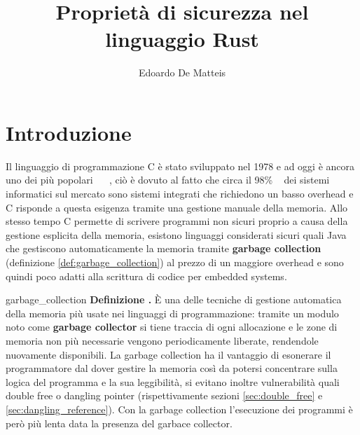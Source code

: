 \documentclass[Lau,binding=0.6cm]{sapthesis}
\title{Proprietà di sicurezza nel linguaggio Rust}
\author{Edoardo De Matteis}
\newenvironment{myDefinition}[2]{ \begin{Definizione}[adjusted title=#1]{}{#2}
    \textbf{Definizione \thetcbcounter.} }{\end{Definizione}}
\begin{document}
\frontmatter

\maketitle




\tableofcontents


\mainmatter

\chapter{Introduzione} \label{sec:politica_di_sicurezza}
Il linguaggio di programmazione C è stato sviluppato nel 1978 e ad oggi è ancora uno dei più popolari ~\cite{tiobe:index} ~\cite{pypl:index}, ciò è dovuto al fatto che circa il 98\% ~\cite{real_men_program_in_c} dei sistemi informatici sul mercato sono sistemi integrati che richiedono un basso overhead e C risponde a questa esigenza tramite una gestione manuale della memoria. 
Allo stesso tempo C permette di scrivere programmi non sicuri proprio a causa della gestione esplicita della memoria, esistono linguaggi considerati sicuri quali Java che gestiscono automaticamente la memoria tramite \textbf{garbage collection} (definizione \ref{def:garbage_collection}) al prezzo di un maggiore overhead e sono quindi poco adatti alla scrittura di codice per embedded systems.

\begin{myDefinition}{Garbage collection}{garbage_collection}
    È una delle tecniche di gestione automatica della memoria più usate nei linguaggi di programmazione: tramite un modulo noto come \textbf{garbage collector} si tiene traccia di ogni allocazione e le zone di memoria non più necessarie vengono periodicamente liberate, rendendole nuovamente disponibili. La garbage collection ha il vantaggio di esonerare il programmatore dal dover gestire la memoria così da potersi concentrare sulla logica del programma e la sua leggibilità, si evitano inoltre vulnerabilità quali double free o dangling pointer (rispettivamente sezioni \ref{sec:double_free} e \ref{sec:dangling_reference}). Con la garbage collection l'esecuzione dei programmi è però più lenta data la presenza del garbace collector.
\end{myDefinition}
\end{document}
